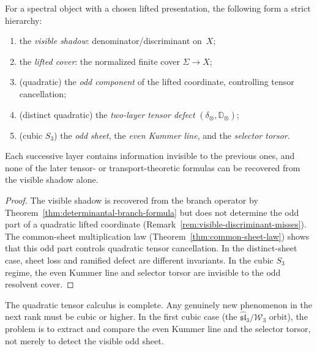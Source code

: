 \begin{theorem}
\label{thm:spectral-hierarchy}
For a spectral object with a chosen lifted presentation, the
following form a strict hierarchy:
\begin{enumerate}[label=\textup{(\roman*)}]
\item the \emph{visible shadow}: denominator/discriminant
  on~$X$;
\item the \emph{lifted cover}: the normalized finite cover
  $\Sigma \to X$;
\item \textup{(quadratic)} the \emph{odd component} of the
  lifted coordinate, controlling tensor cancellation;
\item \textup{(distinct quadratic)} the \emph{two-layer
  tensor defect} $(\delta_\otimes, \mathbb{D}_\otimes)$;
\item \textup{(cubic $S_3$)} the \emph{odd sheet}, the
  \emph{even Kummer line}, and the \emph{selector torsor}.
\end{enumerate}
Each successive layer contains information invisible to the
previous ones, and none of the later tensor- or
transport-theoretic formulas can be recovered from the visible
shadow alone.
\end{theorem}

\begin{proof}
The visible shadow is recovered from the branch operator by
Theorem~\ref{thm:determinantal-branch-formula} but does not
determine the odd part of a quadratic lifted coordinate
(Remark~\ref{rem:visible-discriminant-misses}).  The common-sheet
multiplication law
(Theorem~\ref{thm:common-sheet-law}) shows that this odd part
controls quadratic tensor cancellation.  In the distinct-sheet case,
sheet loss and ramified defect are different invariants.  In the
cubic $S_3$ regime, the even Kummer line and selector torsor are
invisible to the odd resolvent cover.
\end{proof}

\begin{corollary}
\label{cor:frontier-is-cubic}
The quadratic tensor calculus is complete.  Any genuinely new
phenomenon in the next rank must be cubic or higher.  In the first
cubic case
\textup{(}the $\widehat{\mathfrak{sl}}_3 / \mathcal{W}_3$
orbit\textup{)}, the problem is to extract and compare the even
Kummer line and the selector torsor, not merely to detect the
visible odd sheet.
\end{corollary}

